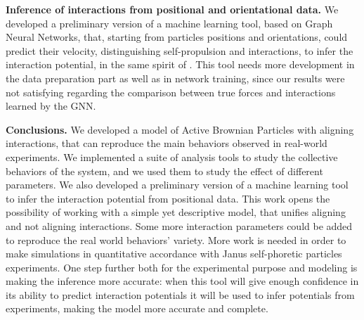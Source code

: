 \documentclass[a4paper, notitlepage]{report} %
\begin{document}
	
	\textbf{Inference of interactions from positional and orientational data.} 
	We developed a preliminary version of a machine learning tool, based on Graph Neural Networks, that, starting from particles positions and orientations, could predict their velocity, distinguishing self-propulsion and interactions, to infer the interaction potential, in the same spirit of \cite{ruiz-garcia_discovering_2024}.
	This tool needs more development in the data preparation part as well as in network training, since our results were not satisfying regarding the comparison between true forces and interactions learned by the GNN.

	\textbf{Conclusions.}
	We developed a model of Active Brownian Particles with aligning interactions, that can reproduce the main behaviors observed in real-world experiments.
	We implemented a suite of analysis tools to study the collective behaviors of the system, and we used them to study the effect of different parameters.
	We also developed a preliminary version of a machine learning tool to infer the interaction potential from positional data.
	This work opens the possibility of working with a simple yet descriptive model, that unifies aligning and not aligning interactions.
	Some more interaction parameters could be added to reproduce the real world behaviors' variety.
	More work is needed in order to make simulations in quantitative accordance with Janus self-phoretic particles experiments.
	One step further both for the experimental purpose and modeling is making the inference more accurate: when this tool will give enough confidence in its ability to predict interaction potentials it will be used to infer potentials from experiments, making the model more accurate and complete.
	

	\printbibliography
\end{document}
